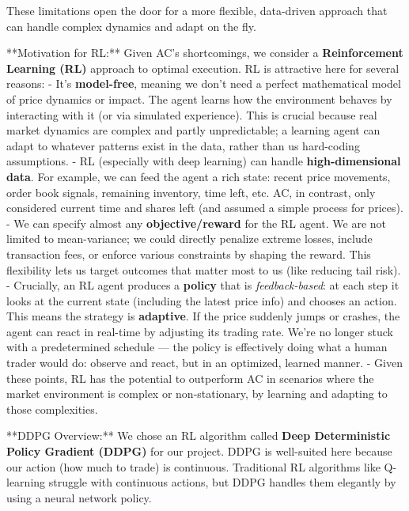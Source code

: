 \documentclass[11pt]{article}
\begin{document}
	These limitations open the door for a more flexible, data-driven approach that can handle complex dynamics and adapt on the fly.



	**Motivation for RL:** Given AC’s shortcomings, we consider a \textbf{Reinforcement Learning (RL)} approach to optimal execution. RL is attractive here for several reasons:
	- It’s \textbf{model-free}, meaning we don’t need a perfect mathematical model of price dynamics or impact. The agent learns how the environment behaves by interacting with it (or via simulated experience). This is crucial because real market dynamics are complex and partly unpredictable; a learning agent can adapt to whatever patterns exist in the data, rather than us hard-coding assumptions.
	- RL (especially with deep learning) can handle \textbf{high-dimensional data}. For example, we can feed the agent a rich state: recent price movements, order book signals, remaining inventory, time left, etc. AC, in contrast, only considered current time and shares left (and assumed a simple process for prices).
	- We can specify almost any \textbf{objective/reward} for the RL agent. We are not limited to mean-variance; we could directly penalize extreme losses, include transaction fees, or enforce various constraints by shaping the reward. This flexibility lets us target outcomes that matter most to us (like reducing tail risk).
	- Crucially, an RL agent produces a \textbf{policy} that is \textit{feedback-based}: at each step it looks at the current state (including the latest price info) and chooses an action. This means the strategy is \textbf{adaptive}. If the price suddenly jumps or crashes, the agent can react in real-time by adjusting its trading rate. We’re no longer stuck with a predetermined schedule — the policy is effectively doing what a human trader would do: observe and react, but in an optimized, learned manner.
	- Given these points, RL has the potential to outperform AC in scenarios where the market environment is complex or non-stationary, by learning and adapting to those complexities.


	**DDPG Overview:** We chose an RL algorithm called \textbf{Deep Deterministic Policy Gradient (DDPG)} for our project. DDPG is well-suited here because our action (how much to trade) is continuous. Traditional RL algorithms like Q-learning struggle with continuous actions, but DDPG handles them elegantly by using a neural network policy.
	
\end{document}
